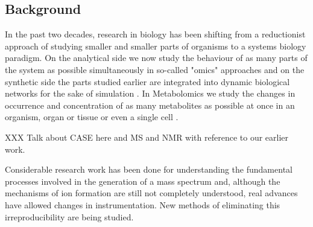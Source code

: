 \documentclass[10pt]{bmc_article}
\newenvironment{bmcformat}{\begin{raggedright}\baselineskip20pt\sloppy\setboolean{publ}{false}}{\end{raggedright}\baselineskip20pt\sloppy}
\begin{document}
\begin{bmcformat}








\section*{Background}

In the past two decades, research in biology has been shifting from a reductionist approach of 
studying smaller and smaller parts of organisms to a systems biology paradigm. On the analytical side 
we now study the behaviour of as many parts of the system as possible simultaneously in so-called "omics" 
approaches and on the synthetic side the parts studied earlier are integrated into dynamic biological networks
for the sake of simulation \cite{Weckwerth:2003p2788}.
In Metabolomics we study the changes in occurrence and concentration of as many metabolites as possible at once 
in an organism, organ or tissue or even a single cell \cite{MIZUNO:2008p2919}.  

XXX Talk about CASE here and MS and NMR with reference to our earlier work.

Considerable research work has been done for understanding the fundamental 
processes involved in the generation of a mass spectrum and, although the mechanisms of ion formation are still not 
completely understood, real advances have allowed changes in instrumentation. 
New methods of eliminating this irreproducibility are being 
studied\cite{bacon1984}.


\end{bmcformat}
\end{document}
